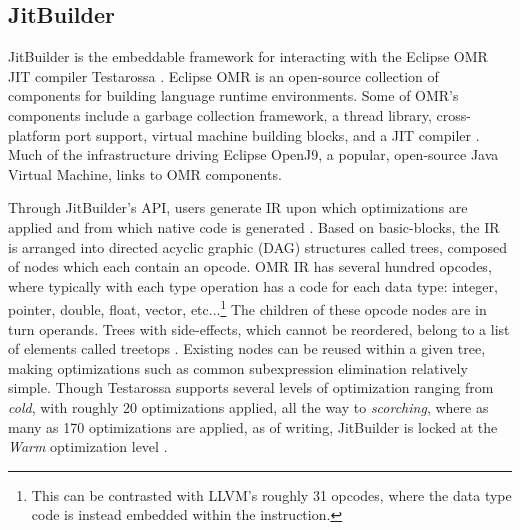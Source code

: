 \subsection{JitBuilder}
JitBuilder is the embeddable framework for interacting with the Eclipse OMR JIT compiler Testarossa \cite{jitbuilderPaper}.
Eclipse OMR is an open-source collection of components for building language runtime environments.
Some of OMR's components include a garbage collection framework, a thread library, cross-platform port support, virtual machine building blocks, and a JIT compiler \cite{eclipseOMR,RebuildingAirliner}.
Much of the infrastructure driving Eclipse OpenJ9, a popular, open-source Java Virtual Machine, links to OMR components.

Through JitBuilder's API, users generate IR upon which optimizations are applied and from which native code is generated \cite{SuganumaIBMJit}.
Based on basic-blocks, the IR is arranged into directed acyclic graphic (DAG) structures called trees, composed of nodes which each contain an opcode.
OMR IR has several hundred opcodes, where typically with each type operation has a code for each data type: integer, pointer, double, float, vector, etc...\footnote{
    This can be contrasted with LLVM's roughly 31 opcodes, where the data type code is instead embedded within the instruction.
}
The children of these opcode nodes are in turn operands.
Trees with side-effects, which cannot be reordered, belong to a list of elements called treetops \cite{treetops}.
Existing nodes can be reused within a given tree, making optimizations such as common subexpression elimination relatively simple.
Though Testarossa supports several levels of optimization ranging from \textit{cold}, with roughly 20 optimizations applied, all the way to \textit{scorching}, where as many as 170 optimizations are applied, as of writing, JitBuilder is locked at the \textit{Warm} optimization level \cite{sanchez2011using, jitbuilderWarm}.



